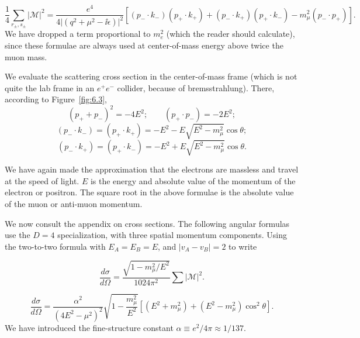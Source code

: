 \begin{equation}
  \frac14\sum_{r_\pm,s_\pm}|\mathcal{M}|^2
  =\frac{e^4}{4\lvert(q^2+\mu^2-\ii\epsilon)\rvert^2}
  \left[(p_-\!\cdot k_-)(p_+\!\cdot k_+)+(p_-\!\cdot k_+)(p_+\!\cdot k_-)
  -m_\mu^2(p_-\!\cdot p_+)\right].
  \label{eq:6.8}
\end{equation}
We have dropped a term proportional to $m_e^2$ (which the reader should calculate), since
these formulae are always used at center-of-mass energy above twice the muon mass.


We evaluate the scattering cross section in the center-of-mass frame (which is not
quite the lab frame in an $e^+e^-$ collider, because of bremsstrahlung). There, according
to Figure~\ref{fig:6.3},
\begin{equation*}
  (p_++p_-)^2=-4E^2;\qquad (p_+\!\cdot p_-)=-2E^2;
\end{equation*}
\begin{equation*}
  (p_-\!\cdot k_-)=(p_+\!\cdot k_+)
  =-E^2-E\sqrt{E^2-m_\mu^2}\cos\theta;
\end{equation*}
\begin{equation*}
  (p_-\!\cdot k_+)=(p_+\!\cdot k_-)
  =-E^2+E\sqrt{E^2-m_\mu^2}\cos\theta.
\end{equation*}

We have again made the approximation that the electrons are massless and travel at the
speed of light. $E$ is the energy and absolute value of the momentum of the electron or
positron. The square root in the above formulae is the absolute value of the muon or
anti-muon momentum.

We now consult the appendix on cross sections. The following angular formulas use
the $D=4$ specialization, with three spatial momentum components. Using the
two-to-two formula with
$E_A=E_B=E$, and $|v_A-v_B|=2$ to write

\begin{equation}
  \frac{d\sigma}{d\Omega}=\frac{\sqrt{1-m_\mu^2/E^2}}{1024\pi^2}
  \sum|\mathcal{M}|^2.
  \label{eq:6.9}
\end{equation}

\begin{equation}
  \frac{d\sigma}{d\Omega}
  =\frac{\alpha^2}{(4E^2-\mu^2)^2}\sqrt{1-\frac{m_\mu^2}{E^2}}
  \left[(E^2+m_\mu^2)+(E^2-m_\mu^2)\cos^2\theta\right].
  \label{eq:6.10}
\end{equation}
We have introduced the fine-structure constant $\alpha\equiv e^2/4\pi\approx1/137$.

